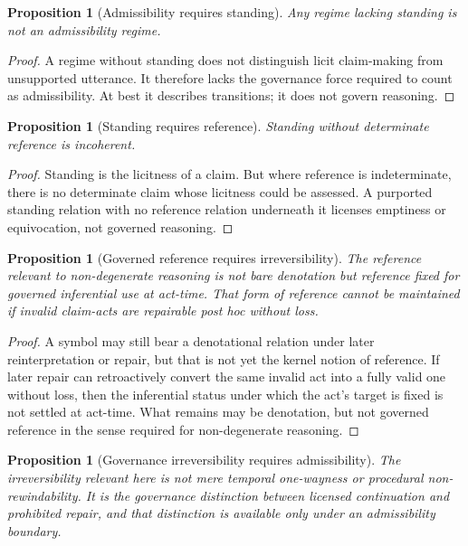 \documentclass[11pt]{article}
\theoremstyle{plain}
\newtheorem{proposition}[theorem]{Proposition}
\theoremstyle{definition}
\begin{document}
\begin{proposition}[Admissibility requires standing]
\label{prop:A-adm-requires-stand}
Any regime lacking standing is not an admissibility regime.
\end{proposition}

\begin{proof}
A regime without standing does not distinguish licit claim-making from unsupported utterance. It therefore lacks the governance force required to count as admissibility. At best it describes transitions; it does not govern reasoning.
\end{proof}

\begin{proposition}[Standing requires reference]
\label{prop:A-stand-requires-ref}
Standing without determinate reference is incoherent.
\end{proposition}

\begin{proof}
Standing is the licitness of a claim. But where reference is indeterminate, there is no determinate claim whose licitness could be assessed. A purported standing relation with no reference relation underneath it licenses emptiness or equivocation, not governed reasoning.
\end{proof}

\begin{proposition}[Governed reference requires irreversibility]
\label{prop:A-ref-requires-irr}
The reference relevant to non-degenerate reasoning is not bare denotation but reference fixed for governed inferential use at act-time. That form of reference cannot be maintained if invalid claim-acts are repairable post hoc without loss.
\end{proposition}

\begin{proof}
A symbol may still bear a denotational relation under later reinterpretation or repair, but that is not yet the kernel notion of reference. If later repair can retroactively convert the same invalid act into a fully valid one without loss, then the inferential status under which the act's target is fixed is not settled at act-time. What remains may be denotation, but not governed reference in the sense required for non-degenerate reasoning.
\end{proof}

\begin{proposition}[Governance irreversibility requires admissibility]
\label{prop:A-irr-requires-adm}
The irreversibility relevant here is not mere temporal one-wayness or procedural non-rewindability. It is the governance distinction between licensed continuation and prohibited repair, and that distinction is available only under an admissibility boundary.
\end{proposition}
\end{document}
